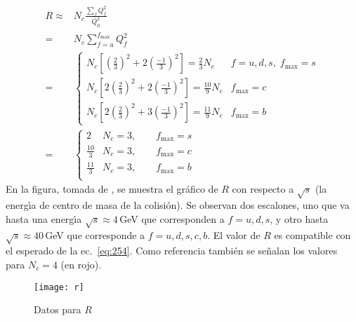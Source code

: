 \begin{align}
\label{eq:254}
R\approx&N_c\frac{\sum_f Q_f^2}{Q_\mu^2}\nonumber\\
=&N_c\sum_{f=u}^{f_{\text{max}}} Q_f^2\nonumber\\
=&
\begin{cases}
  N_c[(\frac{2}{3})^2+2(\frac{-1}{3})^2]=\frac{2}{3}N_c&f=u,d,s,\;f_{\text{max}}=s\\
  N_c[2(\frac{2}{3})^2+2(\frac{-1}{3})^2]=\frac{10}{9}N_c&f_{\text{max}}=c\\
  N_c[2(\frac{2}{3})^2+3(\frac{-1}{3})^2]=\frac{11}{9}N_c&f_{\text{max}}=b
\end{cases}\nonumber\\
=&
\begin{cases}
  2&N_c=3,\qquad f_{\text{max}}=s\\
  \frac{10}{3}&N_c=3,\qquad f_{\text{max}}=c\\
  \frac{11}{3}&N_c=3,\qquad f_{\text{max}}=b\\
\end{cases}
\end{align}
En la figura, tomada de \cite{a}, se muestra el gr\'afico de $R$ con respecto a $\sqrt{s}$ (la energ\'\i a de centro de masa de la colisi\'on). Se observan dos escalones, uno que va hasta una energ\'\i a $\sqrt{s}\approx4\,$GeV que corresponden a $f=u,d,s$,  y otro hasta $\sqrt{s}\approx40\,$GeV que corresponde a $f=u,d,s,c,b$. El valor de $R$ es compatible con el esperado de la ec.~\eqref{eq:254}. Como referencia tambi\'en se se\~nalan los valores para $N_c=4$ (en rojo). 
\begin{figure}
  \centering
  \texttt{[image: r]}
  \caption{Datos para $R$}
  \label{fig:r}
\end{figure}


